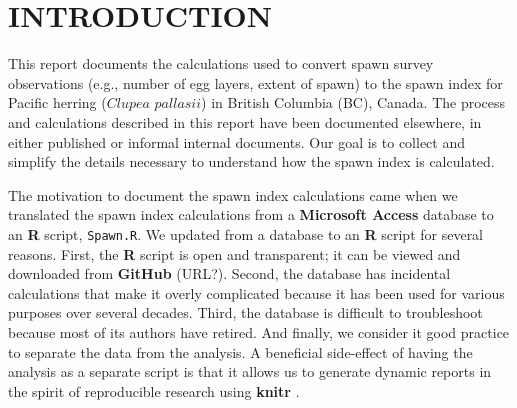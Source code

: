 \documentclass[12pt]{article}
\begin{document}
\renewcommand\listfigurename{LIST OF FIGURES}
\renewcommand\listtablename{LIST OF TABLES}

\renewcommand*{\thefootnote}{\fnsymbol{footnote}}


\tableofcontents \clearpage  %
\listoffigures \listoftables \clearpage  %

\thispagestyle{empty}  %
\renewcommand*{\thefootnote}{\arabic{footnote}}  %
\setcounter{footnote}{0}  %


\section{INTRODUCTION}

This report documents the calculations used to convert spawn survey observations (e.g., number of egg layers, extent of spawn) to the spawn index for Pacific herring ($Clupea$ $pallasii$) in British Columbia (BC), Canada.
The process and calculations described in this report have been documented elsewhere, in either published or informal internal documents.
Our goal is to collect and simplify the details necessary to understand how the spawn index is calculated.

The motivation to document the spawn index calculations came when we translated the spawn index calculations from a \textbf{Microsoft Access} database to an \textbf{R} \citeyearpar[RCT][]{R-3.3.2} script, \texttt{Spawn.R}.
We updated from a database to an \textbf{R} script for several reasons.
First, the \textbf{R} script is open and transparent; it can be viewed and downloaded from \textbf{GitHub} (URL?).
Second, the database has incidental calculations that make it overly complicated because it has been used for various purposes over several decades.
Third, the database is difficult to troubleshoot because most of its authors have retired.
And finally, we consider it good practice to separate the data from the analysis.
A beneficial side-effect of having the analysis as a separate script is that it allows us to generate dynamic reports in the spirit of reproducible research using \textbf{knitr} \citep{Xie2015}.
\end{document}
